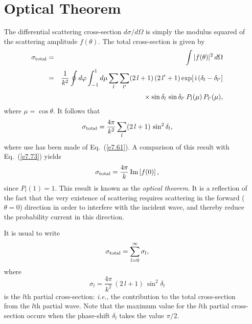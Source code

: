 \section{Optical Theorem}
The differential scattering cross-section $d\sigma/d\Omega$ is simply
the modulus squared of the scattering amplitude $f(\theta)$. The
total cross-section is given by
\begin{eqnarray}
\sigma_{\rm total}& = &\int |f(\theta)|^2\,d\Omega\nonumber\\[0.5ex]
&=& \frac{1}{k^2} \oint d\varphi \int_{-1}^{1} d\mu
\sum_l \sum_{l'} (2\,l+1)\,(2\,l'+1) 
\exp[\,{\rm i}\,(\delta_l-\delta_{l'}]\nonumber\\[0.5ex]
&&\mbox{\hspace{1cm}}\times  \sin\delta_l \,\sin\delta_{l'}\,
P_l(\mu)\, P_{l'}(\mu),
\end{eqnarray}
where $\mu = \cos\theta$. It follows that
\begin{equation}\label{e7.75}
\sigma_{\rm total} = \frac{4\pi}{k^2} \sum_l (2\,l+1)\,\sin^2\delta_l,
\end{equation}
where use has been made of Eq.~(\ref{e7.61}). A comparison of this result with
Eq.~(\ref{e7.73}) yields 
\begin{equation}
\sigma_{\rm total} = \frac{4\pi}{k}\, {\rm Im}\left[f(0)\right],
\end{equation}
since $P_l(1) = 1$. This result is known as the {\em optical theorem}.
It is a reflection of the fact that the very existence of scattering
requires scattering in the forward ($\theta=0$) direction
in order to interfere with the incident wave, and thereby reduce the
probability current in this direction.

It is usual to write
\begin{equation}
\sigma_{\rm total} = \sum_{l=0}^\infty \sigma_l,
\end{equation}
where 
\begin{equation}\label{e7.78}
\sigma_l = \frac{4\pi}{k^2}\, (2\,l+1)\, \sin^2\delta_l
\end{equation}
is the $l$th partial cross-section: {\em  i.e.}, the contribution to the
total cross-section from the $l$th partial wave. Note that the maximum 
value for the $l$th partial cross-section occurs when the phase-shift  $\delta_l$ takes the value $\pi/2$.

